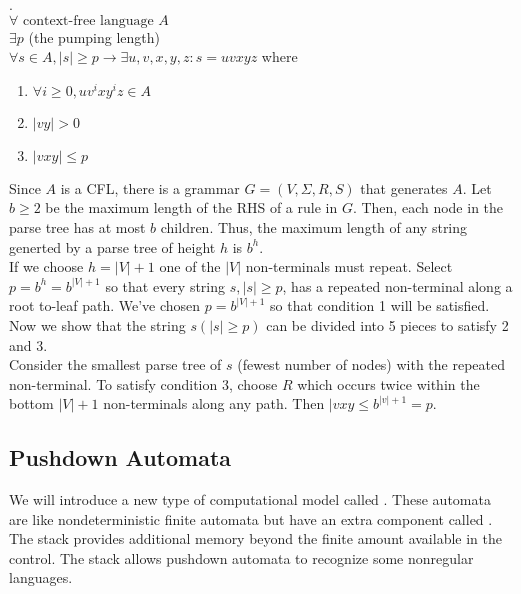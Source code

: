 \documentclass{article}
\begin{document}
\begin{definition}. \\
  $\forall \textrm{ context-free language } A$ \\ 
  $\exists p$ (the pumping length) \\ 
  $\forall s \in A, |s| \geq p \rightarrow \exists u,v,x,y,z:s = uvxyz$ where 
  \begin{enumerate}
    \item $\forall i \geq 0, uv^i xy^i z \in A$ 
    \item $|vy| > 0$ 
    \item $|vxy| \leq p$
  \end{enumerate}

   Since $A$ is a CFL, there is a grammar $G = (V, \Sigma, R, S)$ that generates $A$. Let $b \geq 2$ be the maximum length of the RHS of a rule in $G$. Then, each node in the parse tree has at most $b$ children. Thus, the maximum length of any string generted by a parse tree of height $h$ is $b^h$. \\ 

If we choose $h = |V| + 1$ one of the $|V|$ non-terminals must repeat. Select $p=b^h = b^{|V|+1}$ so that every string $s, |s| \geq p$, has a repeated non-terminal along a root to-leaf path. We've chosen $p= b^{|V| +1}$ so that condition 1 will be satisfied. Now we show that the string $s(|s| \geq p)$ can be divided into 5 pieces to satisfy 2 and 3. \\ 

  Consider the smallest parse tree of $s$ (fewest number of nodes) with the repeated non-terminal. To satisfy condition 3, choose $R$ which occurs twice within the bottom $|V| + 1$ non-terminals along any path. Then $|vxy \leq b^{|v|+1} = p$.
\end{definition}

\subsection{Pushdown Automata}

We will introduce a new type of computational model called . These automata are like nondeterministic finite automata but have an extra component called . The stack provides additional memory beyond the finite amount available in the control. The stack allows pushdown automata to recognize some nonregular languages. \\ 
\end{document}
